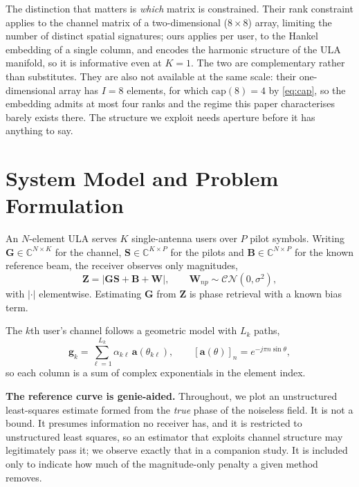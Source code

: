 \documentclass[journal]{IEEEtran}
\newcommand{\bG}{\mathbf{G}}
\newcommand{\bS}{\mathbf{S}}
\newcommand{\bB}{\mathbf{B}}
\newcommand{\bW}{\mathbf{W}}
\newcommand{\bZ}{\mathbf{Z}}
\newcommand{\bg}{\mathbf{g}}
\newcommand{\CN}{\mathcal{CN}}
\begin{document}
The distinction that matters is \emph{which} matrix is constrained. Their rank
constraint applies to the channel matrix of a two-dimensional ($8\times8$)
array, limiting the number of distinct spatial signatures; ours applies per
user, to the Hankel embedding of a single column, and encodes the harmonic
structure of the ULA manifold, so it is informative even at $K=1$. The two are
complementary rather than substitutes. They are also not available at the same
scale: their one-dimensional array has $I=8$ elements, for which
$\mathrm{cap}(8)=4$ by \eqref{eq:cap}, so the embedding admits at most four
ranks and the regime this paper characterises barely exists there. The
structure we exploit needs aperture before it has anything to say.

\section{System Model and Problem Formulation}
\label{sec:model}

An $N$-element ULA serves $K$ single-antenna users over $P$ pilot symbols.
Writing $\bG\in\mathbb{C}^{N\times K}$ for the channel, $\bS\in\mathbb{C}^{K
\times P}$ for the pilots and $\bB\in\mathbb{C}^{N\times P}$ for the known
reference beam, the receiver observes only magnitudes,
\begin{equation}
\bZ = \left| \bG\bS + \bB + \bW \right|,
\qquad \bW_{np}\sim\CN(0,\sigma^2),
\label{eq:fwd}
\end{equation}
with $|\cdot|$ elementwise. Estimating $\bG$ from $\bZ$ is phase retrieval
with a known bias term.

The $k$th user's channel follows a geometric model with $L_k$ paths,
\begin{equation}
\bg_k = \sum_{\ell=1}^{L_k}\alpha_{k\ell}\,
\mathbf{a}(\theta_{k\ell}),\qquad
[\mathbf{a}(\theta)]_n = e^{-j\pi n \sin\theta},
\label{eq:chan}
\end{equation}
so each column is a sum of complex exponentials in the element index.

\textbf{The reference curve is genie-aided.} Throughout, we plot an
unstructured least-squares estimate formed from the \emph{true} phase of the
noiseless field. It is not a bound. It presumes information no receiver has,
and it is restricted to unstructured least squares, so an estimator that
exploits channel structure may legitimately pass it; we observe exactly that
in a companion study. It is included only to indicate how much of the
magnitude-only penalty a given method removes.
\end{document}

